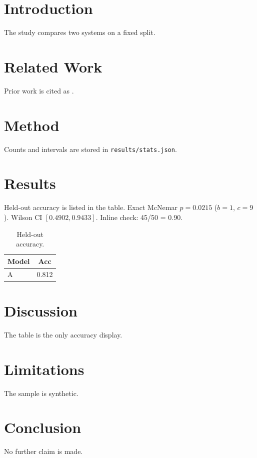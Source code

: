 \documentclass{article}
\begin{document}
\begin{abstract}
Synthetic submission used only as a mechanical-check fixture.
\end{abstract}
\section{Introduction}
The study compares two systems on a fixed split.
\section{Related Work}
Prior work is cited as \cite{vaswani2017,notinthebib}.
\section{Method}
Counts and intervals are stored in \texttt{results/stats.json}.

\section{Results}
Held-out accuracy is listed in the table.
Exact McNemar $p=0.0215$ ($b=1$, $c=9$).
Wilson CI $[0.4902, 0.9433]$.
Inline check: 45/50 = 0.90.

\begin{table}
\caption{Held-out accuracy.}
\label{tab:acc}
\begin{tabular}{lc}
\toprule
Model & Acc \\
\midrule
A & 0.812 \\
\bottomrule
\end{tabular}
\end{table}
\section{Discussion}
The table is the only accuracy display.
\section{Limitations}
The sample is synthetic.
\section{Conclusion}
No further claim is made.
\end{document}
